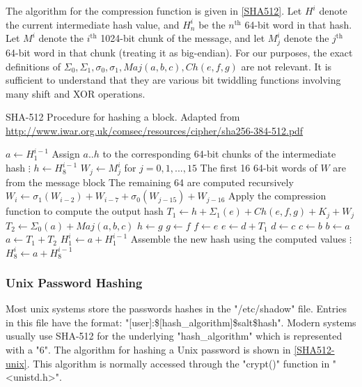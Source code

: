 The algorithm for the compression function is given in \ref{SHA512}. Let $H^i$ denote the current
intermediate hash value, and $H^i_n$ be the $n^{\text{th}}$ 64-bit word in that hash. Let $M^i$ denote the
$i^{\text{th}}$ 1024-bit chunk of the message, and let $M^i_j$ denote the $j^{\text{th}}$ 64-bit word in that chunk (treating it as big-endian).
For our purposes, the exact definitions of $\Sigma_0, \Sigma_1, \sigma_0, \sigma_1, Maj(a,b,c),
Ch(e,f,g)$ are not relevant. It is sufficient to understand that they are various bit twiddling functions involving 
many shift and XOR operations.

\begin{algorithm}[!htb]
  \label{SHA512}
  \caption{SHA-512 Procedure for hashing a block. Adapted from \url{http://www.iwar.org.uk/comsec/resources/cipher/sha256-384-512.pdf}}
  \begin{algorithmic}
    \State $a \leftarrow H^{i-1}_1$
    \Comment Assign $a..h$ to the corresponding 64-bit chunks of the intermediate hash
    \State $\vdots$
    \State $h \leftarrow H^{i-1}_8$
    \State $W_j \leftarrow M_j^i$ for $j=0,1,...,15$
    \Comment The first 16 64-bit words of $W$ are from the message block
    \Comment The remaining 64 are computed recursively
      \State $W_i \leftarrow \sigma_1(W_{i-2}) + W_{i-7} + \sigma_0(W_{j-15}) + W_{j-16}$
    \EndFor
      \Comment Apply the compression function to compute the output hash
      \State $T_1 \leftarrow h + \Sigma_1(e) + Ch(e,f,g) + K_j + W_j$
      \State $T_2 \leftarrow \Sigma_0(a) + Maj(a,b,c)$
      \State $h \leftarrow g$
      \State $g \leftarrow f$
      \State $f \leftarrow e$
      \State $e \leftarrow d + T_1$
      \State $d \leftarrow c$
      \State $c \leftarrow b$
      \State $b \leftarrow a$
      \State $a \leftarrow T_1 + T_2$
    \EndFor
    \State $H_1^i \leftarrow a + H^{i-1}_1$
    \Comment Assemble the new hash using the computed values
    \State $\vdots$
    \State $H_8^i \leftarrow a + H^{i-1}_8$
    \EndProcedure
  \end{algorithmic}
\end{algorithm}

\subsubsection{Unix Password Hashing}
Most unix systems store the passwords hashes in the "/etc/shadow" file. Entries in this file have the format: "[user]:\$[hash_algorithm]\$salt\$hash".
Modern systems usually use SHA-512 for the underlying "hash_algorithm" which is represented
with a "6". The algorithm for hashing a Unix password is shown in \ref{SHA512-unix}. This algorithm is normally
accessed through the "crypt()" function in "<unistd.h>".

